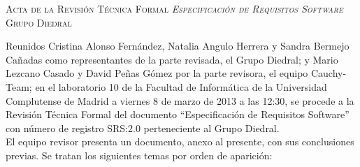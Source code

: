 \documentclass[twoside, a4paper, 11pt]{article}
\begin{document}
	\begin{center}
		\scshape \large Acta de la Revisión Técnica Formal \textit{Especificación de Requisitos Software} \\ Grupo Diedral \vspace{.5cm}
	\end{center}

	Reunidos Cristina Alonso Fernández, Natalia Angulo Herrera y Sandra Bermejo Cañadas como \hbox{representantes} de la parte revisada, el Grupo Diedral; y Mario Lezcano Casado y David Peñas Gómez por la parte revisora, el equipo Cauchy-Team; en el laboratorio 10 de la Facultad de Informática de la Universidad Complutense de Madrid a viernes 8 de marzo de 2013 a las 12:30, se procede a la Revisión Técnica Formal del documento ``Especificación de Requisitos Software'' con número de registro SRS:2.0 perteneciente al Grupo Diedral.\\

	El equipo revisor presenta un documento, anexo al presente, con sus conclusiones previas. Se tratan los siguientes temas por orden de aparición:
\end{document}
